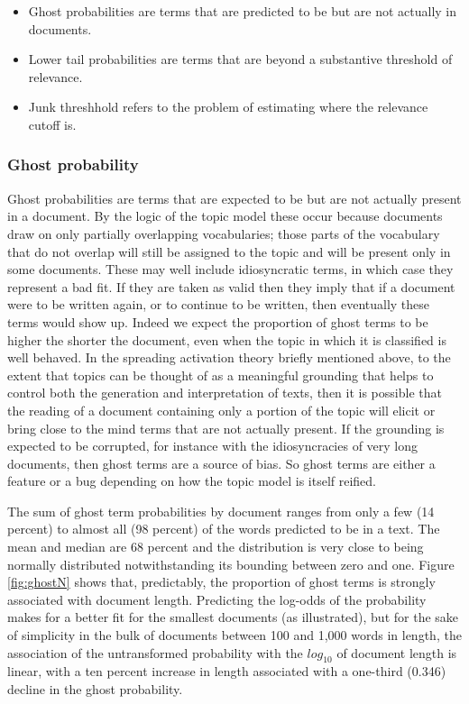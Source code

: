 \documentclass[]{book}
\providecommand{\tightlist}{%
  \setlength{\itemsep}{0pt}\setlength{\parskip}{0pt}}
\theoremstyle{definition}
\theoremstyle{definition}
\theoremstyle{definition}
\theoremstyle{remark}
\begin{document}
\begin{itemize}
\tightlist
\item
  Ghost probabilities are terms that are predicted to be but are not
  actually in documents.
\item
  Lower tail probabilities are terms that are beyond a substantive
  threshold of relevance.
\item
  Junk threshhold refers to the problem of estimating where the
  relevance cutoff is.
\end{itemize}

\hypertarget{ghost-probability}{%
\subsubsection{Ghost probability}\label{ghost-probability}}

Ghost probabilities are terms that are expected to be but are not
actually present in a document. By the logic of the topic model these
occur because documents draw on only partially overlapping vocabularies;
those parts of the vocabulary that do not overlap will still be assigned
to the topic and will be present only in some documents. These may well
include idiosyncratic terms, in which case they represent a bad fit. If
they are taken as valid then they imply that if a document were to be
written again, or to continue to be written, then eventually these terms
would show up. Indeed we expect the proportion of ghost terms to be
higher the shorter the document, even when the topic in which it is
classified is well behaved. In the spreading activation theory briefly
mentioned above, to the extent that topics can be thought of as a
meaningful grounding that helps to control both the generation and
interpretation of texts, then it is possible that the reading of a
document containing only a portion of the topic will elicit or bring
close to the mind terms that are not actually present. If the grounding
is expected to be corrupted, for instance with the idiosyncracies of
very long documents, then ghost terms are a source of bias. So ghost
terms are either a feature or a bug depending on how the topic model is
itself reified.

The sum of ghost term probabilities by document ranges from only a few
(14 percent) to almost all (98 percent) of the words predicted to be in
a text. The mean and median are 68 percent and the distribution is very
close to being normally distributed notwithstanding its bounding between
zero and one. Figure \ref{fig:ghostN} shows that, predictably, the
proportion of ghost terms is strongly associated with document length.
Predicting the log-odds of the probability makes for a better fit for
the smallest documents (as illustrated), but for the sake of simplicity
in the bulk of documents between 100 and 1,000 words in length, the
association of the untransformed probability with the \(log_{10}\) of
document length is linear, with a ten percent increase in length
associated with a one-third (0.346) decline in the ghost probability.
\end{document}
